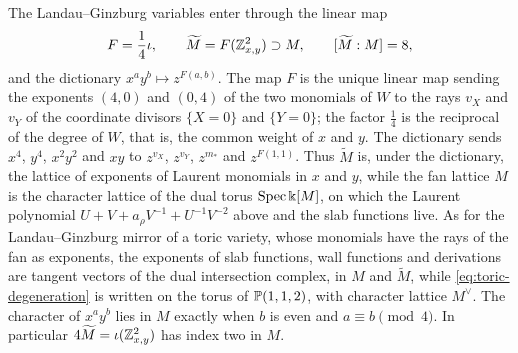 The Landau--Ginzburg variables enter through the linear map
\begin{equation}\label{eq:tilde-M}
 F=\frac14\iota,
 \qquad \widetilde M=F(\mathbb Z^2_{x,y})\supset M,
 \qquad [\widetilde M:M]=8,
\end{equation}
and the dictionary $x^ay^b\mapsto z^{F(a,b)}$.  The map $F$ is the unique
linear map sending the exponents $(4,0)$ and $(0,4)$ of the two monomials of
$W$ to the rays $v_X$ and $v_Y$ of the coordinate divisors $\{X=0\}$ and
$\{Y=0\}$; the factor $\frac14$ is the reciprocal of the degree of $W$, that
is, the common weight of $x$ and $y$.  The dictionary sends
$x^4$, $y^4$, $x^2y^2$ and $xy$ to $z^{v_X}$, $z^{v_Y}$, $z^{m_*}$ and
$z^{F(1,1)}$.  Thus $\widetilde M$ is, under the dictionary, the lattice of
exponents of Laurent monomials in $x$ and $y$, while the fan lattice $M$ is the character lattice
of the dual torus $\operatorname{Spec}\Bbbk[M]$, on which the Laurent polynomial
$U+V+a_\rho V^{-1}+U^{-1}V^{-2}$ above and the slab functions live.  As for the
Landau--Ginzburg mirror of a toric variety, whose monomials have the rays of
the fan as exponents, the exponents of slab functions, wall functions and
derivations are tangent vectors of the dual intersection complex, in $M$
and $\widetilde M$, while
\eqref{eq:toric-degeneration} is written on the torus of $\mathbb P(1,1,2)$, with
character lattice $M^\vee$.  The character
of $x^ay^b$ lies in $M$ exactly when $b$ is even and $a\equiv b\pmod4$.  In
particular $4\widetilde M=\iota(\mathbb Z^2_{x,y})$ has index two in $M$.

